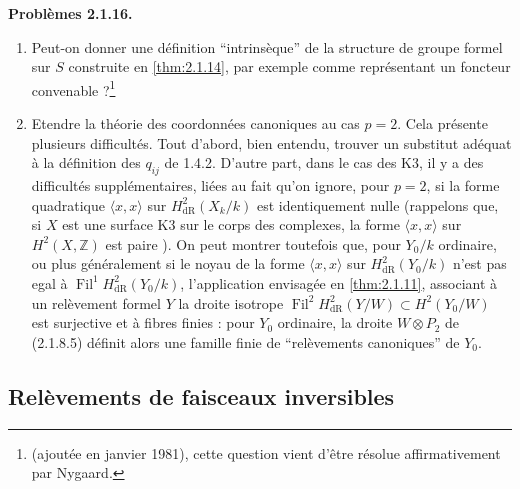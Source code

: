 \documentclass[12pt,a4paper]{article}
\theoremstyle{plain}
\theoremstyle{definition}
\theoremstyle{remark}
\DeclareMathOperator{\Fil}{Fil}
\begin{document}
\textbf{Probl\`emes 2.1.16.}
\begin{enumerate}[label=\alph*)]
\item Peut-on donner une d\'efinition ``intrins\`eque'' de la structure de groupe formel sur $S$ construite en \ref{thm:2.1.14}, par exemple comme repr\'esentant un foncteur convenable ?\footnote{(ajout\'ee en janvier 1981), cette question vient d'\^etre r\'esolue affirmativement par Nygaard.}
\item Etendre la th\'eorie des coordonn\'ees canoniques au cas $p = 2$. Cela pr\'esente plusieurs difficult\'es. Tout d'abord, bien entendu, trouver un substitut ad\'equat \`a la d\'efinition des $q_{ij}$ de 1.4.2. D'autre part, dans le cas des K3, il y a des difficult\'es suppl\'ementaires, li\'ees au fait qu'on ignore, pour $p = 2$, si la forme quadratique $\langle x, x \rangle$ sur $H^2_\mathrm{dR}(X_k/k)$ est identiquement nulle (rappelons que, si $X$ est une surface K3 sur le corps des complexes, la forme $\langle x, x \rangle$ sur $H^2(X, \mathbb{Z})$ est paire \cite{Shafarevitch}). On peut montrer toutefois \cite{Deligne1976} que, pour $Y_0/k$ ordinaire, ou plus g\'en\'eralement si le noyau de la forme $\langle x, x \rangle$ sur $H^2_\mathrm{dR}(Y_0/k)$ n'est pas egal \`a $\Fil^1 H^2_\mathrm{dR}(Y_0/k)$, l'application envisag\'ee en \ref{thm:2.1.11}, associant \`a un rel\`evement formel $Y$ la droite isotrope $\Fil^2 H^2_\mathrm{dR}(Y/W) \subset H^2(Y_0/W)$ est surjective et \`a fibres finies : pour $Y_0$ ordinaire, la droite $W \otimes P_2$ de (2.1.8.5) d\'efinit alors une famille finie de ``rel\`evements canoniques'' de $Y_0$.
\end{enumerate}

\subsection{Rel\`evements de faisceaux inversibles}
\end{document}
